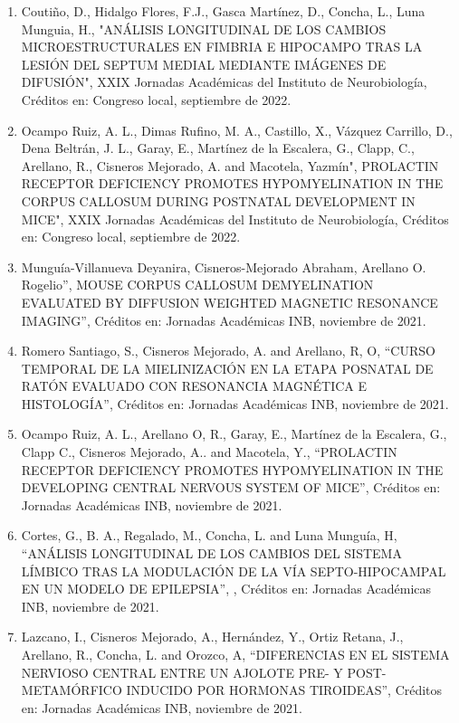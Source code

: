 \begin{enumerate}
\item Coutiño, D., Hidalgo Flores, F.J., Gasca Martínez, D., Concha, L., Luna Munguia, H., "ANÁLISIS LONGITUDINAL DE LOS CAMBIOS MICROESTRUCTURALES EN FIMBRIA E 
HIPOCAMPO TRAS LA LESIÓN DEL SEPTUM MEDIAL MEDIANTE IMÁGENES DE DIFUSIÓN", XXIX Jornadas Académicas del Instituto de Neurobiología, Créditos en: Congreso local, 
septiembre de 2022.

\item Ocampo Ruiz, A. L., Dimas Rufino, M. A., Castillo, X., Vázquez Carrillo, D., Dena Beltrán, J. L., Garay, E., Martínez de la Escalera, G., Clapp, C., 
Arellano, 
R., Cisneros Mejorado, A. and Macotela, Yazmín", PROLACTIN RECEPTOR DEFICIENCY PROMOTES HYPOMYELINATION IN THE CORPUS CALLOSUM DURING POSTNATAL DEVELOPMENT IN 
MICE", XXIX Jornadas Académicas del Instituto de Neurobiología, Créditos en: Congreso local, septiembre de 2022.

\item Munguía-Villanueva Deyanira, Cisneros-Mejorado Abraham, Arellano O. Rogelio”, MOUSE CORPUS CALLOSUM DEMYELINATION EVALUATED BY DIFFUSION WEIGHTED MAGNETIC 
RESONANCE IMAGING”, Créditos en: Jornadas Académicas INB, noviembre de 2021.

\item Romero Santiago, S., Cisneros Mejorado, A. and Arellano, R, O, “CURSO TEMPORAL DE LA MIELINIZACIÓN EN LA ETAPA POSNATAL DE RATÓN EVALUADO CON RESONANCIA 
MAGNÉTICA E HISTOLOGÍA”, Créditos en: Jornadas Académicas INB, noviembre de 2021.

\item Ocampo Ruiz, A. L., Arellano O, R., Garay, E., Martínez de la Escalera, G., Clapp C., Cisneros Mejorado, A.. and Macotela, Y., “PROLACTIN RECEPTOR 
DEFICIENCY 
PROMOTES HYPOMYELINATION IN THE DEVELOPING CENTRAL NERVOUS SYSTEM OF MICE”, Créditos en: Jornadas Académicas INB, noviembre de 2021.

\item Cortes, G., B. A., Regalado, M., Concha, L. and Luna Munguía, H, “ANÁLISIS LONGITUDINAL DE LOS CAMBIOS DEL SISTEMA LÍMBICO TRAS LA MODULACIÓN DE LA 
VÍA 
SEPTO-HIPOCAMPAL EN UN MODELO DE EPILEPSIA”, , Créditos en: Jornadas Académicas INB, noviembre de 2021.

\item Lazcano, I., Cisneros Mejorado, A., Hernández, Y., Ortiz Retana, J., Arellano, R., Concha, L. and Orozco, A, “DIFERENCIAS EN EL SISTEMA NERVIOSO CENTRAL 
ENTRE 
UN AJOLOTE PRE- Y POST- METAMÓRFICO INDUCIDO POR HORMONAS TIROIDEAS”, Créditos en: Jornadas Académicas INB, noviembre de 2021.


\end{enumerate}
